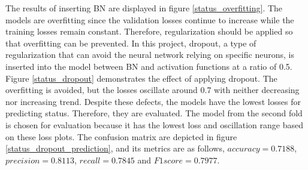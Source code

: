 \documentclass[12pt,twoside]{report}
\begin{document}
The results of inserting BN are displayed in figure \ref{status_overfitting}. The models are overfitting since the validation losses continue to increase while the training losses remain constant. Therefore, regularization should be applied so that overfitting can be prevented. In this project, dropout, a type of regularization that can avoid the neural network relying on specific neurons, is inserted into the model between BN and activation functions at a ratio of 0.5. 
\\

Figure \ref{status_dropout} demonstrates the effect of applying dropout. The overfitting is avoided, but the losses oscillate around 0.7 with neither decreasing nor increasing trend. Despite these defects, the models have the lowest losses for predicting status. Therefore, they are evaluated. The model from the second fold is chosen for evaluation because it has the lowest loss and oscillation range based on these loss plots. The confusion matrix are depicted in figure \ref{status_dropout_prediction}, and its metrics are as follows, $accuracy = 0.7188$, $precision = 0.8113$, $recall = 0.7845$ and $F1 score = 0.7977$.
\\
\end{document}
